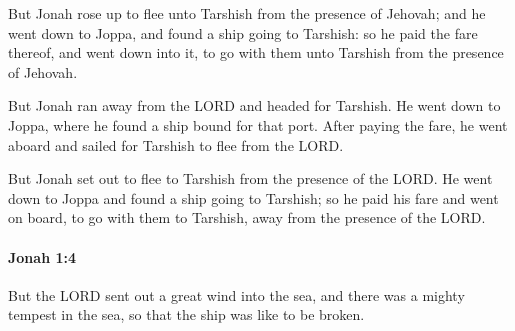 			\begin{versebox}
					\item[BHS] 
					\item[LXX] 
					\item[ASV] But Jonah rose up to flee unto Tarshish from the presence of Jehovah; and he went down to Joppa, and found a ship going to Tarshish: so he paid the fare thereof, and went down into it, to go with them unto Tarshish from the presence of Jehovah.
					\item[NIV] But Jonah ran away from the LORD and headed for Tarshish. He went down to Joppa, where he found a ship bound for that port. After paying the fare, he went aboard and sailed for Tarshish to flee from the LORD.
					\item[NRSV] But Jonah set out to flee to Tarshish from the presence of the LORD. He went down to Joppa and found a ship going to Tarshish; so he paid his fare and went on board, to go with them to Tarshish, away from the presence of the LORD.
			\end{versebox}

		\paragraph{Jonah 1:4} %
			\label{JONAH-1-4}

			But the LORD sent out a great wind into the sea, and there was a mighty tempest in the sea, so that the ship was like to be broken.

